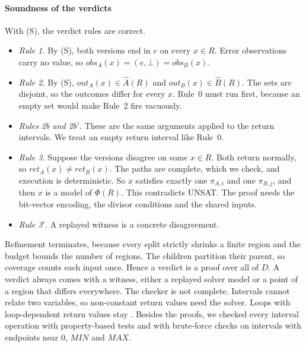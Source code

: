 \paragraph{Soundness of the verdicts}
With (S), the verdict rules are correct.
\begin{itemize}
  \item \emph{Rule 1.} By (S), both versions end in $e$ on every $x \in R$. Error observations
        carry no value, so $\mathit{obs}_A(x) = (e,\bot) = \mathit{obs}_B(x)$.
  \item \emph{Rule 2.} By (S), $\mathit{out}_A(x) \in \hat A(R)$ and
        $\mathit{out}_B(x) \in \hat B(R)$. The sets are disjoint, so the outcomes differ for
        every $x$. Rule~0 must run first, because an empty set would make Rule~2 fire
        vacuously.
  \item \emph{Rules 2b and 2b$'$.} These are the same arguments applied to the return
        intervals. We treat an empty return interval like Rule~0.
  \item \emph{Rule 3.} Suppose the versions disagree on some $x \in R$. Both return normally,
        so $\mathit{ret}_A(x) \neq \mathit{ret}_B(x)$. The paths are complete, which we check,
        and execution is deterministic. So $x$ satisfies exactly one $\pi_{A,i}$ and one
        $\pi_{B,j}$, and then $x$ is a model of $\Phi(R)$. This contradicts UNSAT. The proof
        needs the bit-vector encoding, the divisor conditions and the shared inputs.
  \item \emph{Rule 3$'$.} A replayed witness is a concrete disagreement.
\end{itemize}
Refinement terminates, because every split strictly shrinks a finite region and the budget
bounds the number of regions. The children partition their parent, so coverage counts each
input once. Hence a \pres{} verdict is a proof over all of $D$. A \chg{} verdict always comes
with a witness, either a replayed solver model or a point of a region that differs everywhere.
The checker is not complete. Intervals cannot relate two variables, so non-constant return
values need the solver. Loops with loop-dependent return values stay \unk{}. Besides the
proofs, we checked every interval operation with property-based tests and with brute-force
checks on intervals with endpoints near $0$, $\mathit{MIN}$ and $\mathit{MAX}$.
